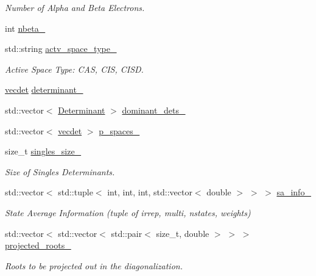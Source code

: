 \begin{DoxyCompactItemize}
\begin{DoxyCompactList}\small\item\em Number of Alpha and Beta Electrons. \end{DoxyCompactList}\item 
int \mbox{\hyperlink{classforte_1_1_f_c_i___m_o_af1b01bf057e3b11ba8ed47e3086d2fa3}{nbeta\+\_\+}}
\item 
std\+::string \mbox{\hyperlink{classforte_1_1_f_c_i___m_o_a6ad882499aa95d72078eb545e28bbd5e}{actv\+\_\+space\+\_\+type\+\_\+}}
\begin{DoxyCompactList}\small\item\em Active Space Type\+: C\+AS, C\+IS, C\+I\+SD. \end{DoxyCompactList}\item 
\mbox{\hyperlink{fci__mo_8h_a777ccac2de1a8940d2f654e59ff12f06}{vecdet}} \mbox{\hyperlink{classforte_1_1_f_c_i___m_o_ae099ef2f75de54f0a81f51388ad89eb2}{determinant\+\_\+}}
\item 
std\+::vector$<$ \mbox{\hyperlink{namespaceforte_a2076c63fd7b8732004d9e1442ce527c1}{Determinant}} $>$ \mbox{\hyperlink{classforte_1_1_f_c_i___m_o_afae4ffab47c3c0bc6ecce5e8d2f36bed}{dominant\+\_\+dets\+\_\+}}
\item 
std\+::vector$<$ \mbox{\hyperlink{fci__mo_8h_a777ccac2de1a8940d2f654e59ff12f06}{vecdet}} $>$ \mbox{\hyperlink{classforte_1_1_f_c_i___m_o_a638d3fde07aa7ac366e225a5d866434c}{p\+\_\+spaces\+\_\+}}
\item 
size\+\_\+t \mbox{\hyperlink{classforte_1_1_f_c_i___m_o_a9ea66938df7b15c6ef9396247c766f6f}{singles\+\_\+size\+\_\+}}
\begin{DoxyCompactList}\small\item\em Size of Singles Determinants. \end{DoxyCompactList}\item 
std\+::vector$<$ std\+::tuple$<$ int, int, int, std\+::vector$<$ double $>$ $>$ $>$ \mbox{\hyperlink{classforte_1_1_f_c_i___m_o_aa554753a1fe18ec6b1ad2d5b4cef784a}{sa\+\_\+info\+\_\+}}
\begin{DoxyCompactList}\small\item\em State Average Information (tuple of irrep, multi, nstates, weights) \end{DoxyCompactList}\item 
std\+::vector$<$ std\+::vector$<$ std\+::pair$<$ size\+\_\+t, double $>$ $>$ $>$ \mbox{\hyperlink{classforte_1_1_f_c_i___m_o_a28237d7d97cc318870efafa2b22e106f}{projected\+\_\+roots\+\_\+}}
\begin{DoxyCompactList}\small\item\em Roots to be projected out in the diagonalization. \end{DoxyCompactList}\item 

\end{DoxyCompactItemize}
